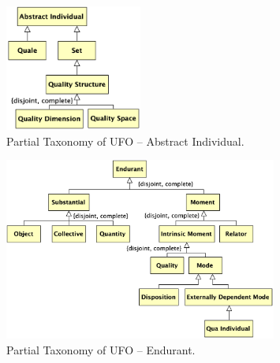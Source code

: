\documentclass{article}
\newcommand{\BeginAbstractIndividualTaxonomy}{51}
\newcommand{\EndAbstractIndividualTaxonomy}{88}
\newcommand{\BeginEndurantTaxonomy}{90}
\newcommand{\EndEndurantTaxonomy}{147}
\begin{document}

\begin{figure}[ht]
    \centering
    \includegraphics[width=0.4\textwidth]{diagrams/Abstract_Individual_Diagram.png}
    \caption{Partial Taxonomy of UFO -- Abstract Individual.}
    \label{fig:ufo_taxonomy_abstract_individual}
\end{figure}




\begin{figure}[ht]
    \centering
    \includegraphics[width=0.8\textwidth]{diagrams/Endurant_Diagram.png}
    \caption{Partial Taxonomy of UFO -- Endurant.}
    \label{fig:ufo_taxonomy_endurant}
\end{figure}



\end{document}
